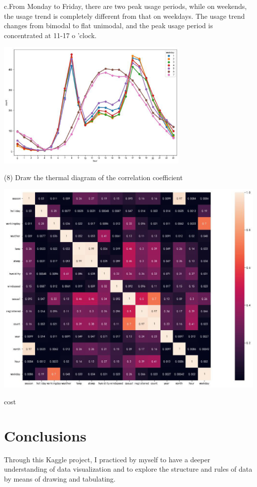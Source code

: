 c.From Monday to Friday, there are two peak usage periods, while on weekends, the usage trend is completely different from that on weekdays. The usage trend changes from bimodal to flat unimodal, and the peak usage period is concentrated at 11-17 o 'clock.
\begin{center}
  \begin{minipage}{1\linewidth}
    \centering
    \includegraphics[width=0.7\textwidth]{pic/three hour2 (1).eps}
  \end{minipage}
  \hfill
\end{center}
 
(8)  Draw the thermal diagram of the correlation coefficient

\begin{center}
  \begin{minipage}{1\linewidth}
    \centering
    \includegraphics[height=0.5\textwidth]{pic/hot (1).eps}
  \end{minipage}
  \hfill
\end{center}


\begin{center}

  \begin{minipage}{0.3\linewidth}
  \centering

  
  {\small{cost}}

  \end{minipage}
\end{center}
\section{Conclusions}

Through this Kaggle project, I practiced by myself to have a deeper understanding of data visualization and to explore the structure and rules of data by means of drawing and tabulating.
